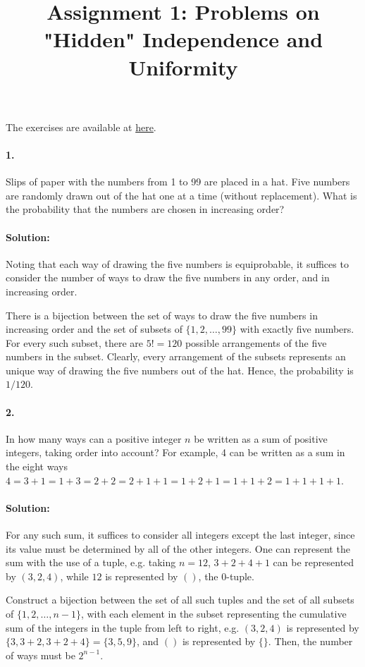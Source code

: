\documentclass{article}
\begin{document}
\title{Assignment 1: Problems on "Hidden" Independence and Uniformity}
\maketitle

The exercises are available at \href{https://ocw.mit.edu/courses/mathematics/18-a34-mathematical-problem-solving-putnam-seminar-fall-2018/assignments/MIT18_A34F18PS1.pdf}{here}.

\paragraph{1.} Slips of paper with the numbers from 1 to 99 are placed in a
hat. Five numbers are randomly drawn out of the hat one at a time (without
replacement). What is the probability that the numbers are chosen in increasing
order?

\paragraph{Solution:} Noting that each way of drawing the five numbers is
equiprobable, it suffices to consider the number of ways to draw the five
numbers in any order, and in increasing order.

There is a bijection between the set of ways to draw the five numbers in
increasing order and the set of subsets of $\{1, 2, \ldots, 99\}$ with exactly
five numbers. For every such subset, there are $5! = 120$ possible arrangements
of the five numbers in the subset. Clearly, every arrangement of the subsets
represents an unique way of drawing the five numbers out of the hat. Hence, the
probability is $1/120$.

\paragraph{2.} In how many ways can a positive integer $n$ be written as a sum
of positive integers, taking order into account? For example, 4 can be written
as a sum in the eight ways $4 = 3 + 1 = 1 + 3 = 2 + 2 = 2 + 1 + 1 = 1 + 2 + 1 =
1 + 1 + 2 = 1 + 1 + 1 + 1$.

\paragraph{Solution:} For any such sum, it suffices to consider all integers
except the last integer, since its value must be determined by all of the other
integers. One can represent the sum with the use of a tuple, e.g. taking $n =
12$, $3 + 2 + 4 + 1$ can be represented by $(3, 2, 4)$, while $12$ is
represented by $()$, the 0-tuple.

Construct a bijection between the set of all such tuples and the set of all
subsets of $\{1, 2, \ldots, n -  1\}$, with each element in the subset
representing the cumulative sum of the integers in the tuple from left to
right, e.g. $(3, 2, 4)$ is represented by $\{3, 3 + 2, 3 + 2 + 4\} = \{3, 5,
9\}$, and $()$ is represented by $\{\}$. Then, the number of ways must be
$2^{n - 1}$.
\end{document}

